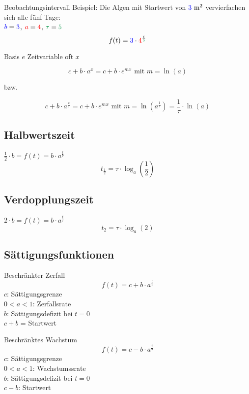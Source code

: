 \begin{multicols}{2}
\begin{rezept*}{Beobachtungsintervall}{}
Beispiel: Die Algen mit Startwert von ${\color{blue}3} \textrm{ m}^2$ ver{\color{red}vier}fachen
sich alle {\color{ForestGreen}fünf} Tage:\\
${\color{blue}b}={\color{blue}3}$, ${\color{red}a}={\color{red}4}$, ${\color{ForestGreen}\tau}={\color{ForestGreen}5}$
$$f(t)= {\color{blue}3}\cdot{}{\color{red}4}^\frac{t}{\color{ForestGreen}5}$$
\end{rezept*}


\begin{gesetz*}{Basis $e$ Zeitvariable oft $x$}{}

$$c+b\cdot{}a^x = c + b\cdot{}e^{mx} \textrm{ mit } m = \ln(a)$$

bzw.

$$c+b\cdot{}a^\frac{x}\tau = c+b\cdot{}e^{mx} \textrm{ mit }
m=\ln(a^\frac1\tau) = \frac1\tau \cdot{}\ln(a)$$

\end{gesetz*}

\subsection*{Halbwertszeit}
$\frac12 \cdot{} b = f(t) = b\cdot{}a^{\frac{t}{\tau}}$
$$t_{\frac12} = \tau\cdot{}\log_a\left(\frac12\right)$$

\subsection*{Verdopplungszeit}
$2\cdot{}b = f(t) = b\cdot{}a^{\frac{t}{\tau}}$
$$t_{2} = \tau\cdot{}\log_a(2)$$

\subsection*{Sättigungsfunktionen}
\begin{gesetz*}{Beschränkter Zerfall}{}
$$f(t) = c + b\cdot{}a^\frac{t}\tau$$
$c$: Sättigungsgrenze\\
$0<a<1$: Zerfallsrate\\
$b$: Sättigungsdefizit bei $t=0$\\
$c+b$ = Startwert 
\end{gesetz*}



\begin{gesetz*}{Beschränktes Wachstum}{}
$$f(t) = c - b\cdot{}a^\frac{t}\tau$$
$c$: Sättigungsgrenze\\
$0<a<1$: Wachstumssrate\\
$b$: Sättigungsdefizit bei $t=0$\\
$c-b$: Startwert
\end{gesetz*}


\end{multicols}
